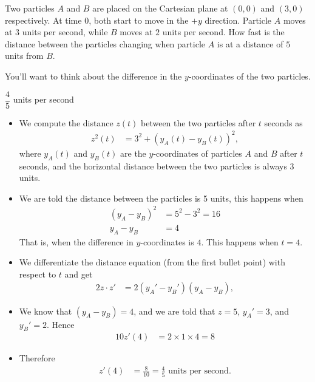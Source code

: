 \begin{question}[2015Q]
Two particles $A$ and $B$ are placed on the Cartesian plane at $(0,0)$ and $(3,0)$
respectively. At time 0, both start to move in the $+y$ direction. Particle $A$ moves at
3 units per second, while $B$ moves at $2$ units per second. How fast is the distance
between the particles changing when particle $A$ is at a distance of $5$ units from $B$.
\end{question}
\begin{hint} You'll want to think about the difference in the $y$-coordinates of the two particles.
\end{hint}
\begin{answer} $\dfrac{4}{5}$ units per second
\end{answer}
\begin{solution}
\begin{itemize}
 \item We compute the distance $z(t)$ between the two particles after $t$ seconds as
\begin{align*}
z^2(t)&= 3^2 + (y_A(t)-y_B(t))^2,
\end{align*}
where $y_A(t)$ and $y_B(t)$ are the $y$-coordinates of particles $A$ and $B$ after $t$
seconds, and the horizontal distance between the two particles is always 3 units.
\item We are told the distance between the particles is 5 units, this happens when
\begin{align*}
  (y_A-y_B)^2 &= 5^2-3^2 = 16\\
  y_A-y_B&=4
\end{align*}
That is, when the difference in $y$-coordinates is $4$. This happens when $t=4$.

\item We differentiate the distance equation (from the first bullet point) with respect to $t$ and get
\begin{align*}
2z \cdot z' &= 2 ({y_A}' - {y_B}') (y_A - y_B),
\end{align*}
\item We know that $(y_A-y_B)=4$, and we are told that $z=5$, $y_A'=3$, and $y_B'=2$. Hence
\begin{align*}
  10z'(4) &=  2 \times1\times4 = 8
\end{align*}
\item Therefore
\begin{align*}
  z'(4) &= \frac{8}{10} = \frac{4}{5} \text{ units per second}.
\end{align*}
\end{itemize}
\end{solution}





